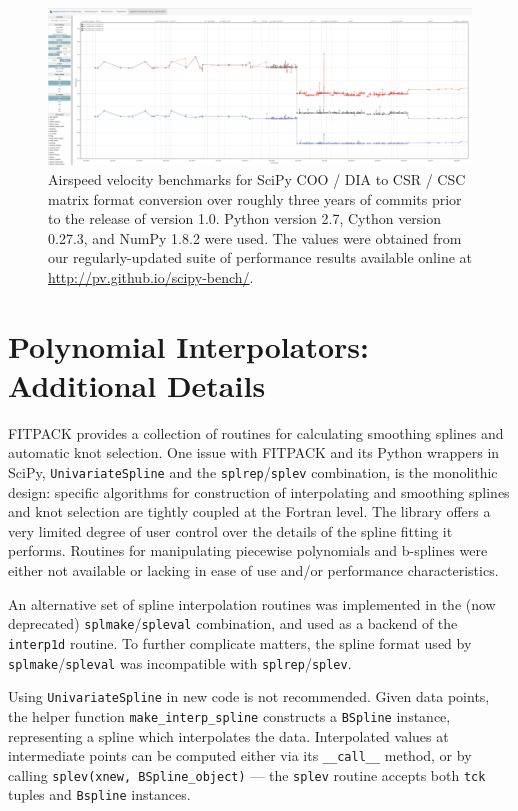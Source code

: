 \documentclass[fleqn,10pt]{wlscirep}
\newcommand{\code}[1]{\texttt{#1}}
\begin{document}
\begin{figure}[H]
\centering
\includegraphics[width=\textwidth]{supporting_info/asv_bench/sparse/sparse_coo_dia_to_csr_csc}
\caption{Airspeed velocity benchmarks for SciPy COO / DIA to CSR / CSC matrix format conversion over roughly three years of commits prior to the release of version 1.0. Python version 2.7, Cython version 0.27.3, and NumPy 1.8.2 were used. The values were obtained from our regularly-updated suite of performance results available online at \url{http://pv.github.io/scipy-bench/}.}
\label{fig:sparse-conv}
\end{figure}

\section{Polynomial Interpolators: Additional Details}
FITPACK provides a collection of routines for calculating
smoothing splines and automatic knot selection. One issue 
with FITPACK and its Python wrappers in SciPy, \code{UnivariateSpline}
and the \code{splrep}/\code{splev} combination, is the monolithic design:
specific algorithms for construction of interpolating and 
smoothing splines and knot selection are tightly coupled 
at the Fortran level. The library offers a very
limited degree of user control over the details 
of the spline fitting it performs. 
%
Routines for manipulating piecewise polynomials and b-splines were either
not available or lacking in ease of use and/or performance characteristics.

An alternative set of spline interpolation routines was implemented in the
(now deprecated) \code{splmake}/\code{spleval} combination, and used as a
backend of the \code{interp1d} routine. To further complicate matters,
the spline format used by \code{splmake}/\code{spleval} was incompatible 
with \code{splrep}/\code{splev}.

Using \code{UnivariateSpline} in new code is not recommended. Given data points,
the helper function \code{make\_interp\_spline} constructs a \code{BSpline}
instance, representing a spline which interpolates the data. Interpolated values
at intermediate points can be computed either via its \code{\_\_call\_\_} method,
or by calling \code{splev(xnew, BSpline\_object)} --- the \code{splev} routine
accepts both \code{tck} tuples and \code{Bspline} instances.
\end{document}
